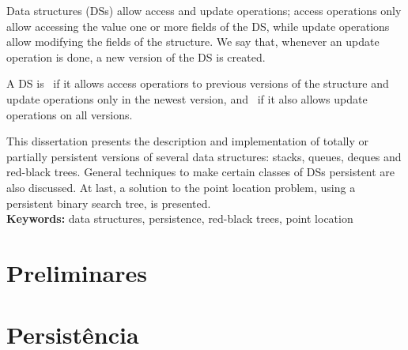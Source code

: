 \documentclass[11pt,oneside,a4paper, openany]{book}
\begin{document}
Data structures (DSs) allow access and update operations; access operations only allow accessing the value one or more fields of the DS, while update operations allow modifying the fields of the structure. We say that, whenever an update operation is done, a new version of the DS is created.

A DS is~ if it allows access operatiors to previous versions of the structure and update operations only in the newest version, and~ if it also allows update operations on all versions.

This dissertation presents the description and implementation of totally or partially persistent versions of several data structures: stacks, queues, deques and red-black trees. General techniques to make certain classes of DSs persistent are also discussed. At last, a solution to the point location problem, using a persistent binary search tree, is presented.
\\

\noindent \textbf{Keywords:} data structures, persistence, red-black trees, point location


\setcounter{tocdepth}{1}

\begingroup
\let\cleardoublepage\clearpage
\tableofcontents
\endgroup

\mainmatter
{}



\part{Preliminares} \label{part:prelim}
%





\part{Persistência} \label{part:persist}
%












%
%
%





\end{document}
